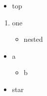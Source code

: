 \documentclass{elsarticle}
\begin{document}
\begin{itemize}
\item top
\end{itemize}
\begin{enumerate}
\item one
\begin{itemize}
\item nested
\end{itemize}
\end{enumerate}
\begin{itemize}
\item a
\begin{itemize}
\item b
\end{itemize}
\end{itemize}
\begin{itemize}[$\ast$]
\item star
\end{itemize}
\end{document}
